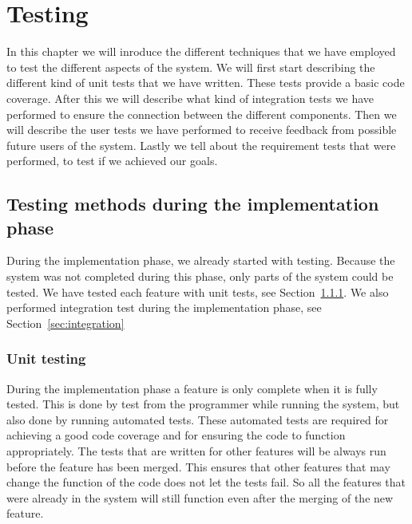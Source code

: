 \chapter{Testing}
\label{sec:testing}
In this chapter we will inroduce the different techniques that we have employed to test the different aspects of the system.
We will first start describing the different kind of unit tests that we have written.
These tests provide a basic code coverage.
After this we will describe what kind of integration tests we have performed to ensure the connection between the different components.
Then we will describe the user tests we have performed to receive feedback from possible future users of the system.
Lastly we tell about the requirement tests that were performed, to test if we achieved our goals.

\section{Testing methods during the implementation phase}
During the implementation phase, we already started with testing.
Because the system was not completed during this phase, only parts of the system could be tested.
We have tested each feature with unit tests, see Section~\ref{sec:unit_test}.
We also performed integration test during the implementation phase, see Section~\ref{sec:integration}

\subsection{Unit testing}
\label{sec:unit_test}
During the implementation phase a feature is only complete when it is fully tested.
This is done by test from the programmer while running the system, but also done by running automated tests.
These automated tests are required for achieving a good code coverage and for ensuring the code to function appropriately.
The tests that are written for other features will be always run before the feature has been merged.
This ensures that other features that may change the function of the code does not let the tests fail.
So all the features that were already in the system will still function even after the merging of the new feature.

